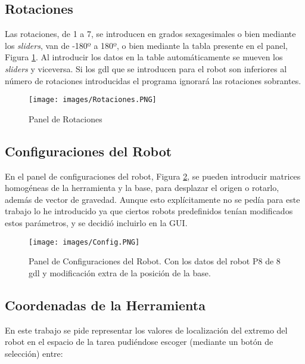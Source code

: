 \documentclass[a4paper, fontsize=11pt]{scrartcl} %
\numberwithin{equation}{section} %
\numberwithin{figure}{section} %
\numberwithin{table}{section} %
\begin{document}
	\subsection{Rotaciones}
	
	Las rotaciones, de 1 a 7, se introducen en grados sexagesimales o bien mediante los \textit{sliders}, van de -180º a 180º, o bien mediante la tabla presente en el panel, Figura \ref{Rotaciones}. Al introducir los datos en la table automáticamente se mueven los \textit{sliders} y viceversa. Si los gdl que se introducen para el robot son inferiores al número de rotaciones introducidas el programa ignorará las rotaciones sobrantes.\\
	
	\begin{figure}[h!]
		\centering
		\texttt{[image: images/Rotaciones.PNG]}
		\caption{Panel de Rotaciones}
		\label{Rotaciones}
	\end{figure}
	\FloatBarrier
	
	\subsection{Configuraciones del Robot}
	
	En el panel de configuraciones del robot, Figura \ref{Configuraciones}, se pueden introducir matrices homogéneas de la herramienta y la base, para desplazar el origen o rotarlo, además de vector de gravedad. Aunque esto explícitamente no se pedía para este trabajo lo he introducido ya que ciertos robots predefinidos tenían modificados estos parámetros, y se decidió incluirlo en la GUI.\\
	
	\begin{figure}[h!]
		\centering
		\texttt{[image: images/Config.PNG]}
		\caption{Panel de Configuraciones del Robot. Con los datos del robot P8 de 8 gdl y modificación extra de la posición de la base.}
		\label{Configuraciones}
	\end{figure}
	\FloatBarrier
	
	\subsection{Coordenadas de la Herramienta}
	
	En este trabajo se pide representar los valores de localización del extremo del robot en el espacio de la tarea pudiéndose escoger (mediante un botón de selección) entre:
	
\end{document}
